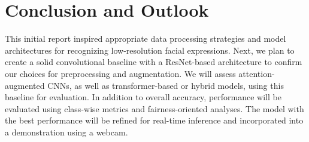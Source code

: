 \section{Conclusion and Outlook} 

This initial report inspired appropriate data processing strategies and model architectures for recognizing low-resolution facial expressions. Next, we plan to create a solid convolutional baseline with a ResNet-based architecture to confirm our choices for preprocessing and augmentation. We will assess attention-augmented CNNs, as well as transformer-based or hybrid models, using this baseline for evaluation. In addition to overall accuracy, performance will be evaluated using class-wise metrics and fairness-oriented analyses. The model with the best performance will be refined for real-time inference and incorporated into a demonstration using a webcam.